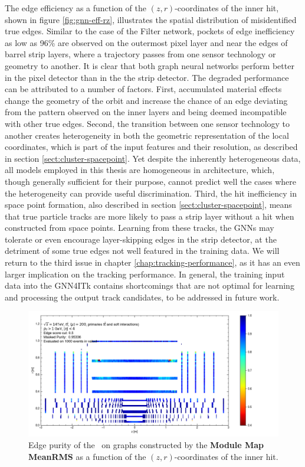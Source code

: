 The edge efficiency as a function of the $(z,r)$-coordinates of the inner hit, shown in figure \ref{fig:gnn-eff-rz}, illustrates the spatial distribution of misidentified true edges. 
Similar to the case of the Filter network, pockets of edge inefficiency as low as 96\% are observed on the outermost pixel layer and near the edges of barrel strip layers, where a trajectory passes from one sensor technology or geometry to another. 
It is clear that both graph neural networks perform better in the pixel detector than in the the strip detector. 
The degraded performance can be attributed to a number of factors. 
First, accumulated material effects change the geometry of the orbit and increase the chance of an edge deviating from the pattern observed on the inner layers and being deemed incompatible with other true edges.
Second, the transition between one sensor technology to another creates heterogeneity in both the geometric representation of the local coordinates, which is part of the input features and their resolution, as described in section \ref{sect:cluster-spacepoint}.
Yet despite the inherently heterogeneous data, all models employed in this thesis are homogeneous in architecture, which, though generally sufficient for their purpose, cannot predict well the cases where the heterogeneity can provide useful discrimination. 
Third, the hit inefficiency in space point formation, also described in section \ref{sect:cluster-spacepoint}, means that true particle tracks are more likely to pass a strip layer without a hit when constructed from space points.
Learning from these tracks, the GNNs may tolerate or even encourage layer-skipping edges in the strip detector, at the detriment of some true edges not well featured in the training data.
We will return to the third issue in chapter \ref{chap:tracking-performance}, as it has an even larger implication on the tracking performance. 
In general, the training input data into the GNN4ITk contains shortcomings that are not optimal for learning and processing the output track candidates, to be addressed in future work.

\begin{figure}[h!]
    \centering
    \includegraphics[width=\textwidth, trim={0cm 0 2.85cm 0}, clip]{figures/gnn-meanrms/gnn_MM_UNCLEANED_MEANRMS_WITHOUT_CONCAT_LATENT128_LN/gnn_edge_wise_pur_rz_check_masked_purity_rz.png}
    \caption{Edge purity of the \ignn~on graphs constructed by the \textbf{Module Map MeanRMS} as a function of the $(z,r)$-coordinates of the inner hit.}
    \label{fig:gnn-pur-rz}
\end{figure}

